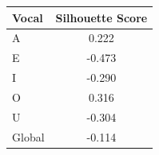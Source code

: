 \begin{tabular}{lc}
\toprule
\rowcolor{col01}
Vocal & Silhouette Score \\
\midrule
A & 0.222 \\
E & -0.473 \\
I & -0.290 \\
O & 0.316 \\
U & -0.304 \\
Global & -0.114 \\
\bottomrule
\end{tabular}
